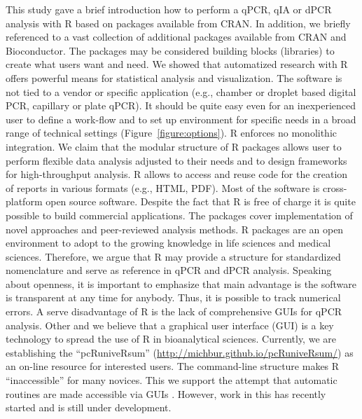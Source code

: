 This study gave a brief introduction how to perform a qPCR, qIA or dPCR analysis 
with R based on packages available from CRAN. In addition, we briefly referenced 
to a vast collection of additional packages available from CRAN and 
Bioconductor. The packages may be considered building blocks (libraries) to 
create what users want and need. We showed that automatized research with R 
offers powerful means for statistical analysis and visualization. The software 
is not tied to a vendor or specific application (e.g., chamber or droplet based 
digital PCR, capillary or plate qPCR). It should be quite easy even for an 
inexperienced user to define a work-flow and to set up environment for specific 
needs in a broad range of technical settings (Figure~\ref{figure:options}). R 
enforces no monolithic integration. We claim that the modular structure of R 
packages allows user to perform flexible data analysis adjusted to their needs 
and to design frameworks for high-throughput analysis. R allows to access and 
reuse code for the creation of reports in various formats (e.g., HTML, PDF). 
Most of the software is cross-platform open source software. Despite the fact 
that R is free of charge it is quite possible to build commercial applications. 
The packages cover implementation of novel approaches and peer-reviewed analysis 
methods. R packages are an open environment to adopt to the growing knowledge in 
life sciences and medical sciences. Therefore, we argue that R may provide a 
structure for standardized nomenclature and serve as reference in qPCR and dPCR 
analysis. Speaking about openness, it is important to emphasize that main 
advantage is the software is transparent at any time for anybody. Thus, it is 
possible to track numerical errors.  A serve disadvantage of R is the lack of 
comprehensive GUIs for qPCR analysis. Other and we believe that a graphical user 
interface (GUI) is a key technology to spread the use of R in bioanalytical 
sciences. Currently, we are establishing the ``pcRuniveRsum'' 
(\url{http://michbur.github.io/pcRuniveRsum/}) as an on-line resource for 
interested users. The command-line structure makes R ``inaccessible'' for many 
novices. This we support the attempt that automatic routines are made accessible 
via GUIs \citep{rodiger_rkward_2012}. However, work in this has recently started 
and is still under development.

